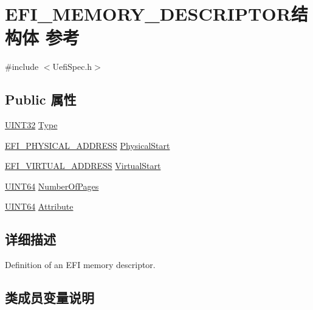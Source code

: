 \hypertarget{struct_e_f_i___m_e_m_o_r_y___d_e_s_c_r_i_p_t_o_r}{}\section{E\+F\+I\+\_\+\+M\+E\+M\+O\+R\+Y\+\_\+\+D\+E\+S\+C\+R\+I\+P\+T\+O\+R结构体 参考}
\label{struct_e_f_i___m_e_m_o_r_y___d_e_s_c_r_i_p_t_o_r}


{\ttfamily \#include $<$Uefi\+Spec.\+h$>$}

\subsection*{Public 属性}
\begin{DoxyCompactItemize}
\item 
\hyperlink{_processor_bind_8h_ae1e6edbbc26d6fbc71a90190d0266018}{U\+I\+N\+T32} \hyperlink{struct_e_f_i___m_e_m_o_r_y___d_e_s_c_r_i_p_t_o_r_ad524e0cfcc4cfe94d02a86e91ae6c225}{Type}
\item 
\hyperlink{_uefi_base_type_8h_a31bc7e7faeab8d2940ee34f21d41cd04}{E\+F\+I\+\_\+\+P\+H\+Y\+S\+I\+C\+A\+L\+\_\+\+A\+D\+D\+R\+E\+SS} \hyperlink{struct_e_f_i___m_e_m_o_r_y___d_e_s_c_r_i_p_t_o_r_afe2d9ce095ab1c1076c87cb95c1fa75a}{Physical\+Start}
\item 
\hyperlink{_uefi_base_type_8h_a353ea2e3d6220a4e32c5f1eb39a1ed6a}{E\+F\+I\+\_\+\+V\+I\+R\+T\+U\+A\+L\+\_\+\+A\+D\+D\+R\+E\+SS} \hyperlink{struct_e_f_i___m_e_m_o_r_y___d_e_s_c_r_i_p_t_o_r_a406b40627f95a63a17a20ec1e1f72e7c}{Virtual\+Start}
\item 
\hyperlink{_processor_bind_8h_a57be03562867144161c1bfee95ca8f7c}{U\+I\+N\+T64} \hyperlink{struct_e_f_i___m_e_m_o_r_y___d_e_s_c_r_i_p_t_o_r_ab9624afb67a7adb70a5ec58f937461b2}{Number\+Of\+Pages}
\item 
\hyperlink{_processor_bind_8h_a57be03562867144161c1bfee95ca8f7c}{U\+I\+N\+T64} \hyperlink{struct_e_f_i___m_e_m_o_r_y___d_e_s_c_r_i_p_t_o_r_a6d3efe24f39b47124fa345471fbb7e17}{Attribute}
\end{DoxyCompactItemize}


\subsection{详细描述}
Definition of an E\+FI memory descriptor. 

\subsection{类成员变量说明}
\mbox{\label{struct_e_f_i___m_e_m_o_r_y___d_e_s_c_r_i_p_t_o_r_a6d3efe24f39b47124fa345471fbb7e17}} 
